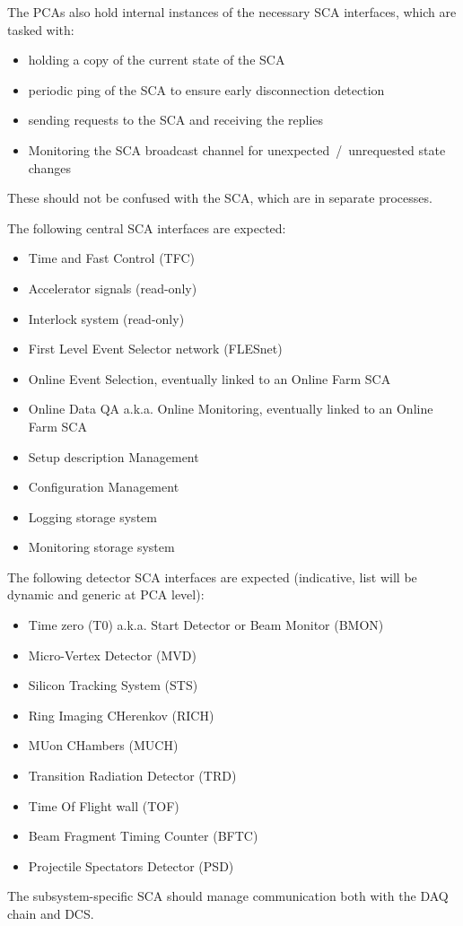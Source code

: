 The \glspl{PCA} also hold internal instances of the necessary SCA interfaces, which are tasked with:
\begin{itemize}
 \item holding a copy of the current state of the SCA
 \item periodic ping of the SCA to ensure early disconnection detection
 \item sending requests to the SCA and receiving the replies
 \item Monitoring the SCA broadcast channel for unexpected~/~unrequested state changes
\end{itemize}
These should not be confused with the SCA, which are in separate processes.

The following central SCA interfaces are expected:
\begin{itemize}
 \item Time and Fast Control (TFC)
 \item Accelerator signals (read-only)
 \item Interlock system (read-only)
 \item First Level Event Selector network (FLESnet)
 \item Online Event Selection, eventually linked to an Online Farm SCA
 \item Online Data QA a.k.a. Online Monitoring, eventually linked to an Online Farm SCA
 \item Setup description Management
 \item Configuration Management
 \item Logging storage system
 \item Monitoring storage system
\end{itemize}
The following detector SCA interfaces are expected (indicative, list will be dynamic and generic at PCA level):
\begin{itemize}
 \item Time zero (T0) a.k.a. Start Detector or Beam Monitor (BMON)
 \item Micro-Vertex Detector (MVD)
 \item Silicon Tracking System (STS)
 \item Ring Imaging CHerenkov (RICH)
 \item MUon CHambers (MUCH)
 \item Transition Radiation Detector (TRD)
 \item Time Of Flight wall (TOF)
 \item Beam Fragment Timing Counter (BFTC)
 \item Projectile Spectators Detector (PSD)
\end{itemize}
The subsystem-specific SCA should manage communication both with the DAQ chain and DCS. 
